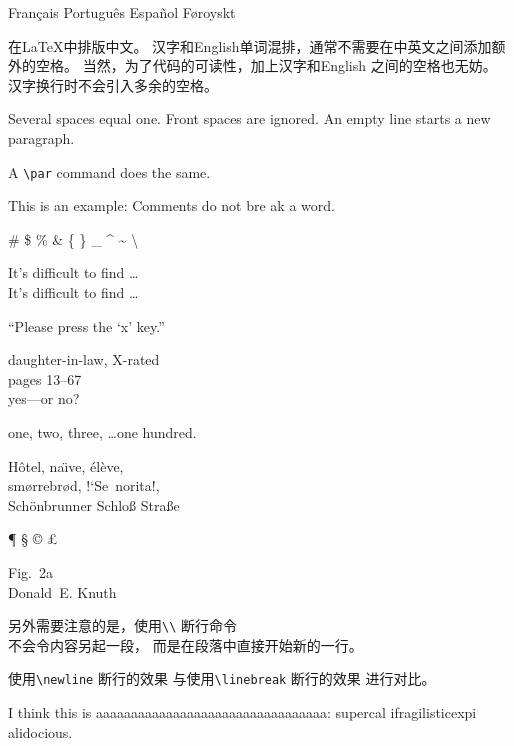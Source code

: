 \documentclass{ctexart}
\begin{document}
Français Português Español Føroyskt

在\LaTeX{}中排版中文。
汉字和English单词混排，通常不需要在中英文之间添加额外的空格。
当然，为了代码的可读性，加上汉字和English 之间的空格也无妨。
汉字换行时不会引入多余的空格。

Several spaces equal one.
Front spaces are ignored.
An empty line starts a new
paragraph.\par
A \verb|\par| command does
the same.

This is an %
example: Comments do not bre%
ak a word.

\# \$ \% \& \{ \} \_
\^{} \~{} \textbackslash

It's difficult to find \ldots\\
It's dif{}f{}icult to f{}ind \ldots

``Please press the `x' key.''

daughter-in-law, X-rated\\
pages 13--67\\
yes---or no?

one, two, three, \ldots one hundred.

H\^otel, na\"\i ve, \'el\`eve,\\
sm\o rrebr\o d, !`Se\ norita!,\\
Sch\"onbrunner Schlo\ss{}
Stra\ss e

\P{} \S{} \dag{} \ddag{}
\copyright{} \pounds{}
\textasteriskcentered
\textperiodcentered
\textbullet
\textregistered{} \texttrademark

Fig.~2a \\
Donald~E. Knuth

另外需要注意的是，使用\verb|\\|
断行命令\\ 不会令内容另起一段，
而是在段落中直接开始新的一行。

使用\verb|\newline| 断行的效果
\newline
与使用\verb|\linebreak| 断行的效果
\linebreak
进行对比。

I think this is aaaaaaaaaaaaaaaaaaaaaaaaaaaaaaaaa: su\-per\-cal\-%
i\-frag\-i\-lis\-tic\-ex\-pi\-%
al\-i\-do\-cious.
\end{document}
